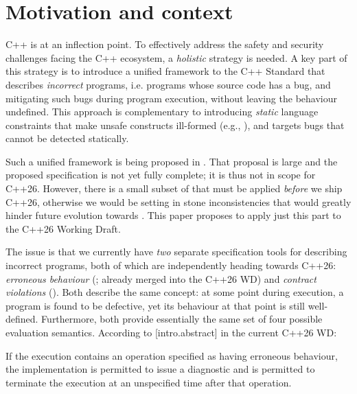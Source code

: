 


\section{Motivation and context}
\label{motivation}

C++ is at an inflection point. To effectively address the safety and security challenges facing the C++ ecosystem, a \emph{holistic} strategy is needed. A key part of this strategy is to introduce a unified framework to the C++ Standard that describes \emph{incorrect} programs, i.e. programs whose source code has a bug, and mitigating such bugs during program execution, without leaving the behaviour undefined. This approach is complementary to introducing \emph{static} language constraints that make unsafe constructs ill-formed (e.g., \cite{P3390R0}), and targets bugs that cannot be detected statically.

Such a unified framework is being proposed in \cite{P3100R1}. That proposal is large and the proposed specification is not yet fully complete; it is thus not in scope for C++26. However, there is a small subset of \cite{P3100R1} that must be applied \emph{before} we ship C++26, otherwise we would be setting in stone inconsistencies that would greatly hinder future evolution towards \cite{P3100R1}. This paper proposes to apply just this part to the C++26 Working Draft.

The issue is that we currently have \emph{two} separate specification tools for describing incorrect programs, both of which are independently heading towards C++26: \emph{erroneous behaviour} (\cite{P2795R5}; already merged into the C++26 WD) and \emph{contract violations} (\cite{P2900R13}). Both describe the same concept: at some point during execution, a program is found to be defective, yet its behaviour at that point is still well-defined. Furthermore, both provide essentially the same set of four possible evaluation semantics. According to [intro.abstract] in the current C++26 WD:
\begin{adjustwidth}{0.5cm}{0.5cm}
If the execution contains an operation specified as having erroneous behaviour, the implementation is permitted to issue a diagnostic and is permitted to terminate the execution at an unspecified time after that operation.
\end{adjustwidth} 

\pagebreak %

